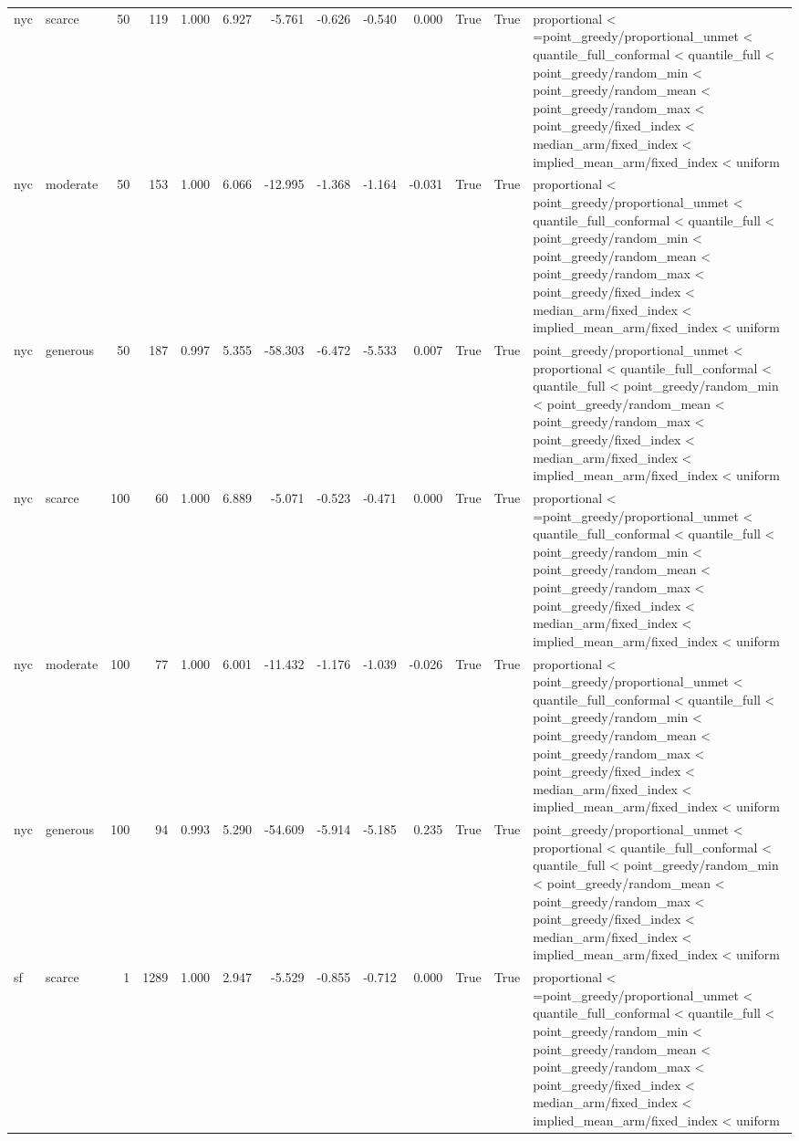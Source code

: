 \begin{tabular}{llrrrrrrrrrrl}
nyc & scarce & 50 & 119 & 1.000 & 6.927 & -5.761 & -0.626 & -0.540 & 0.000 & True & True & proportional < =point\_greedy/proportional\_unmet < quantile\_full\_conformal < quantile\_full < point\_greedy/random\_min < point\_greedy/random\_mean < point\_greedy/random\_max < point\_greedy/fixed\_index < median\_arm/fixed\_index < implied\_mean\_arm/fixed\_index < uniform \\
nyc & moderate & 50 & 153 & 1.000 & 6.066 & -12.995 & -1.368 & -1.164 & -0.031 & True & True & proportional < point\_greedy/proportional\_unmet < quantile\_full\_conformal < quantile\_full < point\_greedy/random\_min < point\_greedy/random\_mean < point\_greedy/random\_max < point\_greedy/fixed\_index < median\_arm/fixed\_index < implied\_mean\_arm/fixed\_index < uniform \\
nyc & generous & 50 & 187 & 0.997 & 5.355 & -58.303 & -6.472 & -5.533 & 0.007 & True & True & point\_greedy/proportional\_unmet < proportional < quantile\_full\_conformal < quantile\_full < point\_greedy/random\_min < point\_greedy/random\_mean < point\_greedy/random\_max < point\_greedy/fixed\_index < median\_arm/fixed\_index < implied\_mean\_arm/fixed\_index < uniform \\
nyc & scarce & 100 & 60 & 1.000 & 6.889 & -5.071 & -0.523 & -0.471 & 0.000 & True & True & proportional < =point\_greedy/proportional\_unmet < quantile\_full\_conformal < quantile\_full < point\_greedy/random\_min < point\_greedy/random\_mean < point\_greedy/random\_max < point\_greedy/fixed\_index < median\_arm/fixed\_index < implied\_mean\_arm/fixed\_index < uniform \\
nyc & moderate & 100 & 77 & 1.000 & 6.001 & -11.432 & -1.176 & -1.039 & -0.026 & True & True & proportional < point\_greedy/proportional\_unmet < quantile\_full\_conformal < quantile\_full < point\_greedy/random\_min < point\_greedy/random\_mean < point\_greedy/random\_max < point\_greedy/fixed\_index < median\_arm/fixed\_index < implied\_mean\_arm/fixed\_index < uniform \\
nyc & generous & 100 & 94 & 0.993 & 5.290 & -54.609 & -5.914 & -5.185 & 0.235 & True & True & point\_greedy/proportional\_unmet < proportional < quantile\_full\_conformal < quantile\_full < point\_greedy/random\_min < point\_greedy/random\_mean < point\_greedy/random\_max < point\_greedy/fixed\_index < median\_arm/fixed\_index < implied\_mean\_arm/fixed\_index < uniform \\
sf & scarce & 1 & 1289 & 1.000 & 2.947 & -5.529 & -0.855 & -0.712 & 0.000 & True & True & proportional < =point\_greedy/proportional\_unmet < quantile\_full\_conformal < quantile\_full < point\_greedy/random\_min < point\_greedy/random\_mean < point\_greedy/random\_max < point\_greedy/fixed\_index < median\_arm/fixed\_index < implied\_mean\_arm/fixed\_index < uniform \\

\end{tabular}
